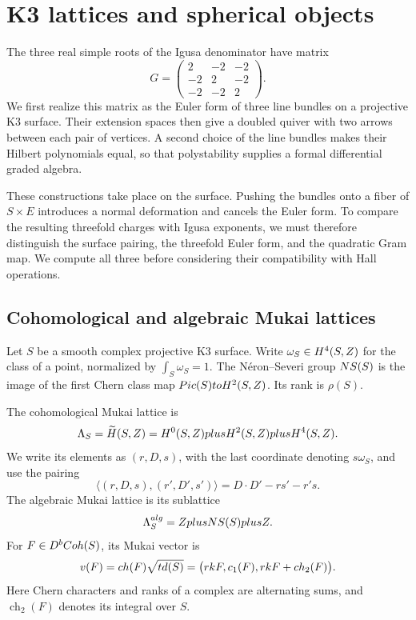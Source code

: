 \chapter{K3 lattices and spherical objects}
\label{ch:k3xe-setup}

The three real simple roots of the Igusa denominator have matrix
\[
G=\begin{pmatrix}2&-2&-2\\-2&2&-2\\-2&-2&2\end{pmatrix}.
\]
We first realize this matrix as the Euler form of three line bundles
on a projective K3 surface.  Their extension spaces then give a doubled
quiver with two arrows between each pair of vertices.  A second choice
of the line bundles makes their Hilbert polynomials equal, so that
polystability supplies a formal differential graded algebra.

These constructions take place on the surface.  Pushing the bundles
onto a fiber of $S\times E$ introduces a normal deformation and cancels
the Euler form.  To compare the resulting threefold charges with
Igusa exponents, we must therefore distinguish the surface pairing,
the threefold Euler form, and the quadratic Gram map.  We compute all
three before considering their compatibility with Hall operations.

\section{Cohomological and algebraic Mukai lattices}
\label{sec:k3xe-mukai-lattice}
\label{subsec:k3-mukai-lattice}

Let $S$ be a smooth complex projective K3 surface.  Write
$\omega_S\in H^4(S,Z)$ for the class of a point, normalized by
$\int_S\omega_S=1$.  The N\'eron--Severi group $NS(S)$ is the image
of the first Chern class map $Pic(S)to H^2(S,Z)$.  Its rank is
$\rho(S)$.

\begin{definition}
\label{def:mukai-lattice}
The cohomological Mukai lattice is
\[
\Lambda_S=\widetilde H(S,Z)
=H^0(S,Z)plus H^2(S,Z)plus H^4(S,Z).
\]
We write its elements as $(r,D,s)$, with the last coordinate denoting
$s\omega_S$, and use the pairing
\[
\langle(r,D,s),(r',D',s')\rangle=D\cdot D'-rs'-r's.
\]
The algebraic Mukai lattice is its sublattice
\[
\Lambda_S^{alg}=ZplusNS(S)plusZ.
\]
For $F\in D^bCoh(S)$, its Mukai vector is
\[
v(F)=ch(F)\sqrt{td(S)}
=\bigl(rk F,c_1(F),rk F+ch_2(F)\bigr).
\]
Here Chern characters and ranks of a complex are alternating sums,
and $\operatorname{ch}_2(F)$ denotes its integral over $S$.
\end{definition}

